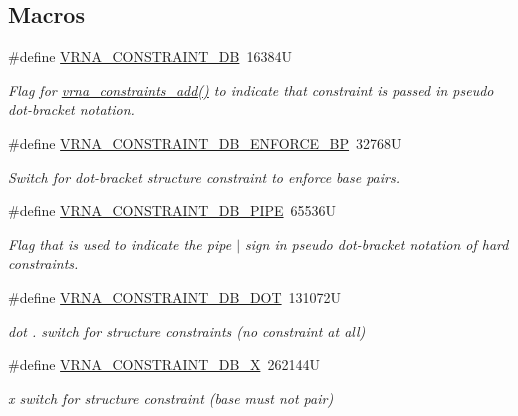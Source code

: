 \subsection*{Macros}
\begin{DoxyCompactItemize}
\item 
\#define \hyperlink{group__hard__constraints_ga4bfc2f15c4f261c62a11af9d2aa80c90}{V\+R\+N\+A\+\_\+\+C\+O\+N\+S\+T\+R\+A\+I\+N\+T\+\_\+\+D\+B}~16384\+U
\begin{DoxyCompactList}\small\item\em Flag for \hyperlink{group__constraints_ga35a401f680969a556858a8dd5f1d07cc}{vrna\+\_\+constraints\+\_\+add()} to indicate that constraint is passed in pseudo dot-\/bracket notation. \end{DoxyCompactList}\item 
\#define \hyperlink{group__hard__constraints_ga29ebe940110d60ab798fdacbcdbbfb7d}{V\+R\+N\+A\+\_\+\+C\+O\+N\+S\+T\+R\+A\+I\+N\+T\+\_\+\+D\+B\+\_\+\+E\+N\+F\+O\+R\+C\+E\+\_\+\+B\+P}~32768\+U
\begin{DoxyCompactList}\small\item\em Switch for dot-\/bracket structure constraint to enforce base pairs. \end{DoxyCompactList}\item 
\#define \hyperlink{group__hard__constraints_ga13053547a2de5532b64b64d35e097ae1}{V\+R\+N\+A\+\_\+\+C\+O\+N\+S\+T\+R\+A\+I\+N\+T\+\_\+\+D\+B\+\_\+\+P\+I\+P\+E}~65536\+U
\begin{DoxyCompactList}\small\item\em Flag that is used to indicate the pipe \textquotesingle{}$\vert$\textquotesingle{} sign in pseudo dot-\/bracket notation of hard constraints. \end{DoxyCompactList}\item 
\#define \hyperlink{group__hard__constraints_ga369bea82eae75fbe626f409fa425747e}{V\+R\+N\+A\+\_\+\+C\+O\+N\+S\+T\+R\+A\+I\+N\+T\+\_\+\+D\+B\+\_\+\+D\+O\+T}~131072\+U
\begin{DoxyCompactList}\small\item\em dot \textquotesingle{}.\textquotesingle{} switch for structure constraints (no constraint at all) \end{DoxyCompactList}\item 
\#define \hyperlink{group__hard__constraints_ga7283bbe0f8954f7b030ecc3f2d1932b2}{V\+R\+N\+A\+\_\+\+C\+O\+N\+S\+T\+R\+A\+I\+N\+T\+\_\+\+D\+B\+\_\+\+X}~262144\+U
\begin{DoxyCompactList}\small\item\em \textquotesingle{}x\textquotesingle{} switch for structure constraint (base must not pair) \end{DoxyCompactList}\item 

\end{DoxyCompactItemize}
